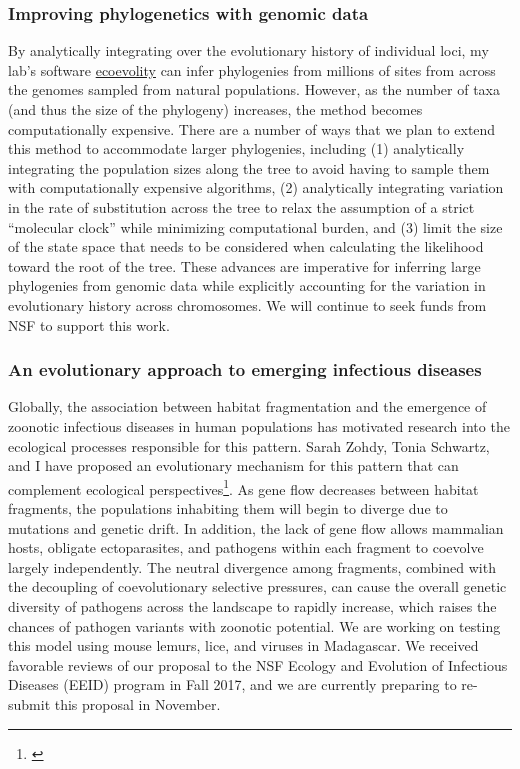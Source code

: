 \subsubsection*{Improving phylogenetics with genomic data}
By analytically integrating over the evolutionary history of individual loci,
my lab's software
\href{http://phyletica.org/ecoevolity/}{ecoevolity}
can infer phylogenies from millions of sites from across the genomes sampled
from natural populations.
However, as the number of taxa (and thus the size of the phylogeny) increases,
the method becomes computationally expensive.
There are a number of ways that we plan to extend this method to accommodate
larger phylogenies, including
(1) analytically integrating the population sizes along the tree to
avoid having to sample them with computationally expensive algorithms,
(2) analytically integrating variation in the rate of substitution
across the tree to relax the assumption of a strict ``molecular clock'' while
minimizing computational burden,
and
(3) limit the size of the state space that needs to be considered when
calculating the likelihood toward the root of the tree.
These advances are imperative for inferring large phylogenies from genomic data
while explicitly accounting for the variation in evolutionary history across
chromosomes.
We will continue to seek funds from NSF to support this work.

\subsubsection*{An evolutionary approach to emerging infectious diseases}
Globally, the association between habitat fragmentation and the emergence of
zoonotic infectious diseases in human populations has motivated research into
the ecological processes responsible for this pattern.
Sarah Zohdy, Tonia Schwartz, and I have proposed an evolutionary mechanism for
this pattern that can complement ecological
perspectives\footnote{\label{Zohdy19}\hspace{-0.8em}}.
As gene flow decreases between habitat fragments, the populations inhabiting
them will begin to diverge due to mutations and genetic drift.
In addition, the lack of gene flow allows mammalian hosts, obligate
ectoparasites, and pathogens within each fragment to coevolve largely
independently.
The neutral divergence among fragments, combined with the decoupling of
coevolutionary selective pressures, can cause the overall genetic
diversity of pathogens across the landscape to rapidly increase,
which raises the chances of pathogen variants with zoonotic potential.
We are working on testing this model using mouse lemurs, lice, and viruses in
Madagascar.
We received favorable reviews of our proposal to the NSF Ecology and Evolution
of Infectious Diseases (EEID) program in Fall 2017, and we are currently
preparing to re-submit this proposal in November.

